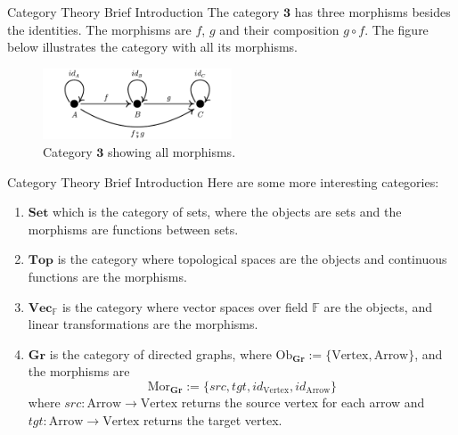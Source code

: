 \documentclass[aspectratio=169,xcolor=dvipsnames,9pt]{beamer}
\begin{document}
\begin{frame}[fragile]{Category Theory Brief Introduction}
	The category $\bm 3$ has three morphisms besides the identities. The morphisms are
	$f$, $g$ and their composition $g \circ f$. The figure below
	illustrates the category with all its morphisms.
	\bigskip
	\begin{figure}[H]
		\begin{center}
			\includegraphics[width=0.50\textwidth]{./figures/3CatComplete}
		\end{center}
		\caption{Category $\bm 3$ showing all morphisms.}
		\label{fig:3Catcomplete}
	\end{figure}
\end{frame}

\begin{frame}[fragile]{Category Theory Brief Introduction}
	Here are some more interesting
	categories:
	\begin{enumerate}[1.]
		\item $\mathbf{Set}$ which is the category of sets, where the objects are sets and the morphisms are functions between sets.
		\item $\mathbf{Top}$ is the category where topological spaces are the objects and continuous functions are the morphisms.
		\item $\mathbf{Vec}_\mathbb F$ is the category where vector spaces over field $\mathbb F$ are the objects,
		      and linear transformations are the morphisms.
		\item $\mathbf{Gr}$ is the category of directed graphs, where $\text{Ob}_{\mathbf{Gr}} := \{\text{Vertex}, \text{Arrow}\}$,
		      and the morphisms are
		      \begin{displaymath}
			      \text{Mor}_{\mathbf{Gr}} := \{
			      src,
			      tgt,
			      id_{\text{Vertex}},
			      id_{\text{Arrow}}
			      \}
		      \end{displaymath}
		      where $src:\text{Arrow} \to \text{Vertex}$ returns the source vertex for each arrow and
		      $tgt:\text{Arrow} \to \text{Vertex}$ returns the target vertex.
	\end{enumerate}
\end{frame}
\end{document}

